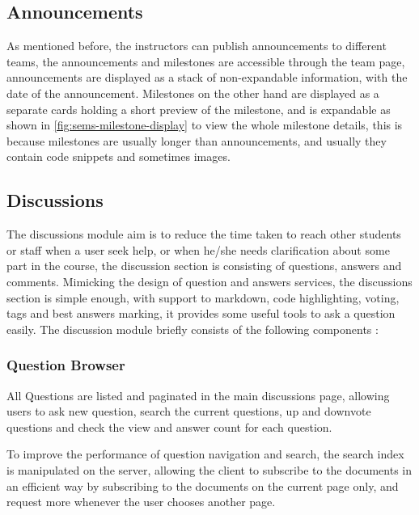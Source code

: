 \subsection{Announcements}
\label{sub:announcements}
As mentioned before, the instructors can publish announcements to different teams, the announcements and milestones are accessible through the
team page, announcements are displayed as a stack of non-expandable information, with the date of the announcement. Milestones on the other hand are
displayed as a separate cards holding a short preview of the milestone, and is expandable as shown in \ref{fig:sems-milestone-display} to view
the whole milestone details, this is because milestones are usually longer than announcements, and usually they contain code snippets and sometimes
images.


\subsection{Discussions}
\label{sub:discussions}
The discussions module aim is to reduce the time taken to reach other students or staff when a user seek help, or when he/she needs
clarification about some part in the course, the discussion section is consisting of questions, answers and comments. Mimicking the
design of question and answers services, the discussions section is simple enough, with support to markdown, code highlighting, voting, tags and
best answers marking, it provides some useful tools to ask a question easily. The discussion module briefly consists of the following components :

\subsubsection{Question Browser}
\label{subs:question-browser}
All Questions are listed and paginated in the main discussions page, allowing users to ask new question, search the current questions, up and
downvote questions and check the view and answer count for each question.

\newParagraph
To improve the performance of question navigation and search, the search index is manipulated on the server, allowing the client to subscribe to
the documents in an efficient way by subscribing to the documents on the current page only, and request more whenever the user chooses another page.

